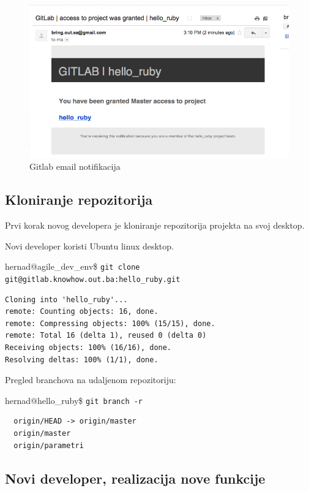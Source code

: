 \documentclass[times, utf8, seminar]{fit}
\begin{document}
\begin{figure}[H]
\centering
\includegraphics[width=15cm]{img/gitlab_email_notification.png}
\caption{Gitlab email notifikacija}
\end{figure}

\subsection{Kloniranje repozitorija}

\setlength{\parindent}{0cm}
Prvi korak novog developera je kloniranje repozitorija projekta na svoj desktop. 

Novi developer koristi Ubuntu linux desktop.

hernad@agile\_dev\_env\$ \newline
\texttt{git clone git@gitlab.knowhow.out.ba:hello\_ruby.git}
\begin{lstlisting}
Cloning into 'hello_ruby'...
remote: Counting objects: 16, done.
remote: Compressing objects: 100% (15/15), done.
remote: Total 16 (delta 1), reused 0 (delta 0)
Receiving objects: 100% (16/16), done.
Resolving deltas: 100% (1/1), done.
\end{lstlisting}

Pregled branchova na udaljenom repozitoriju:

hernad@hello\_ruby\$ \texttt{git branch -r}
\begin{lstlisting}
  origin/HEAD -> origin/master
  origin/master
  origin/parametri
\end{lstlisting}

\subsection{Novi developer, realizacija nove funkcije}
\end{document}
